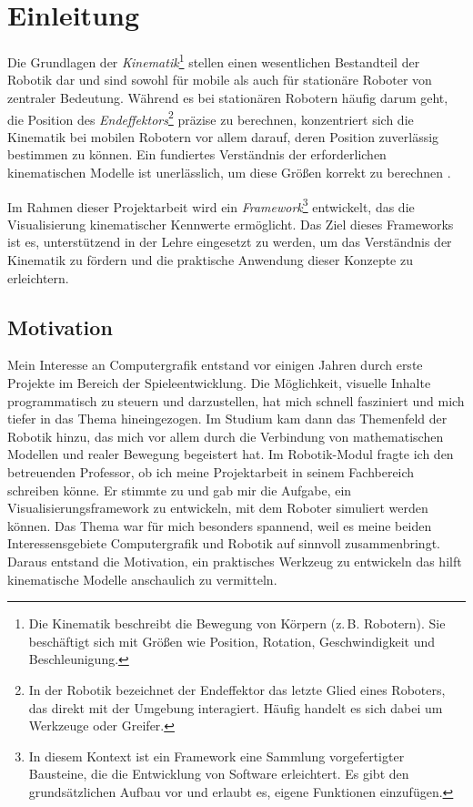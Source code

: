 \section{Einleitung}

Die Grundlagen der \textit{Kinematik}\footnote{Die Kinematik beschreibt die Bewegung von Körpern (z.\,B. Robotern). Sie beschäftigt sich mit Größen wie Position, Rotation, Geschwindigkeit und Beschleunigung.}
stellen einen wesentlichen Bestandteil der Robotik dar und sind sowohl für mobile als auch für stationäre Roboter von zentraler Bedeutung.
Während es bei stationären Robotern häufig darum geht, die Position des \textit{Endeffektors}\footnote{In der Robotik bezeichnet der Endeffektor das letzte Glied eines Roboters, das direkt mit der Umgebung interagiert. Häufig handelt es sich dabei um Werkzeuge oder Greifer.} präzise zu berechnen,
konzentriert sich die Kinematik bei mobilen Robotern vor allem darauf, deren Position zuverlässig bestimmen zu können.
Ein fundiertes Verständnis der erforderlichen kinematischen Modelle ist unerlässlich, um diese Größen korrekt zu berechnen
.

Im Rahmen dieser Projektarbeit wird ein \textit{Framework}\footnote{In diesem Kontext ist ein Framework eine Sammlung vorgefertigter Bausteine, die die Entwicklung von Software erleichtert.
Es gibt den grundsätzlichen Aufbau vor und erlaubt es, eigene Funktionen einzufügen.} entwickelt, das die Visualisierung kinematischer Kennwerte ermöglicht.
Das Ziel dieses Frameworks ist es, unterstützend in der Lehre eingesetzt zu werden,
um das Verständnis der Kinematik zu fördern und die praktische Anwendung dieser Konzepte zu erleichtern.



\subsection{Motivation}
Mein Interesse an Computergrafik entstand vor einigen Jahren durch erste Projekte im Bereich der Spieleentwicklung.
Die Möglichkeit, visuelle Inhalte programmatisch zu steuern und darzustellen, hat mich schnell fasziniert und mich tiefer in das Thema hineingezogen.
Im Studium kam dann das Themenfeld der Robotik hinzu, das mich vor allem durch die Verbindung von mathematischen Modellen und realer Bewegung begeistert hat.
Im Robotik-Modul fragte ich den betreuenden Professor, ob ich meine Projektarbeit in seinem Fachbereich schreiben könne.
Er stimmte zu und gab mir die Aufgabe, ein Visualisierungsframework zu entwickeln, mit dem Roboter simuliert werden können.
Das Thema war für mich besonders spannend, weil es meine beiden Interessensgebiete Computergrafik und Robotik auf sinnvoll zusammenbringt.
Daraus entstand die Motivation, ein praktisches Werkzeug zu entwickeln das hilft
kinematische Modelle anschaulich zu vermitteln.

